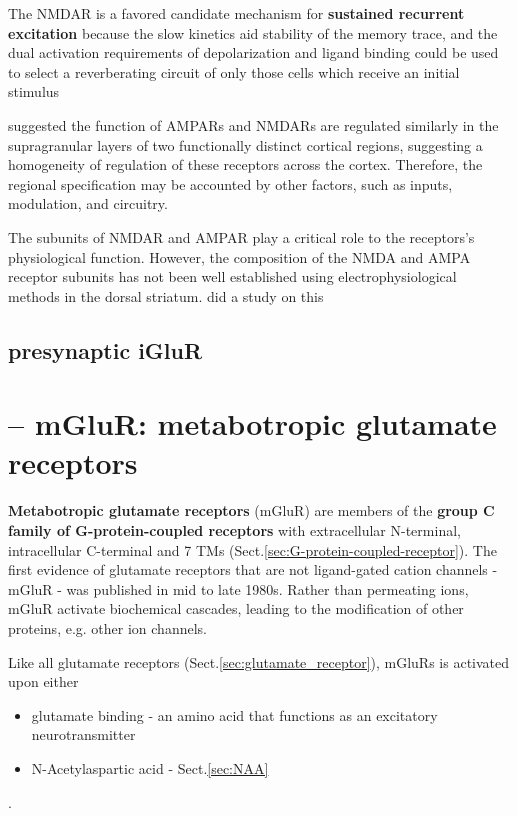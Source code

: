 The NMDAR is a favored candidate mechanism for {\bf sustained recurrent
excitation} because the slow kinetics aid stability of the memory trace, and the
dual activation requirements of depolarization and ligand binding could be used
to select a reverberating circuit of only those cells which receive an initial
stimulus

\citep{myme2003} suggested the function of AMPARs and NMDARs are regulated
similarly in the supragranular layers of two functionally distinct cortical
regions, suggesting a homogeneity of regulation of these receptors across the
cortex. Therefore, the regional specification may be accounted by other factors,
such as inputs, modulation, and circuitry.


The subunits of NMDAR and AMPAR play a critical role to the receptors's
physiological function. However, the composition of the NMDA and AMPA receptor
subunits has not been well established using electrophysiological methods in the
dorsal striatum. \citep{jeun2009} did a study on this

\subsection{presynaptic iGluR}
\label{sec:iGluR-presynaptic}




\section{-- mGluR: metabotropic glutamate receptors}
\label{sec:mGluR}
\label{sec:metabotropic-GluR}

{\bf Metabotropic glutamate receptors} (mGluR) are members of the {\bf group C
family of G-protein-coupled receptors} with extracellular N-terminal,
intracellular C-terminal and 7 TMs (Sect.\ref{sec:G-protein-coupled-receptor}).
The first evidence of glutamate receptors that are not ligand-gated cation
channels - mGluR - was published in mid to late 1980s. Rather than permeating
ions, mGluR activate biochemical cascades, leading to the modification of other
proteins, e.g. other ion channels.

Like all glutamate receptors (Sect.\ref{sec:glutamate_receptor}), mGluRs is
activated upon either 
\begin{itemize}
  \item glutamate binding - an amino acid that functions as an
excitatory neurotransmitter

  \item N-Acetylaspartic acid - Sect.\ref{sec:NAA}
\end{itemize}.

